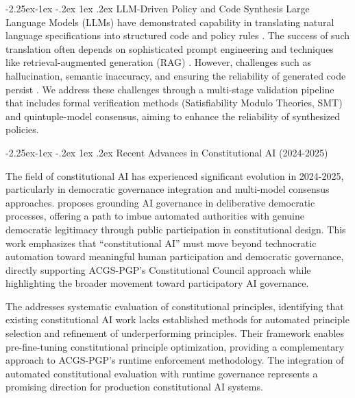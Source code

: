 \documentclass[manuscript,screen,9pt]{acmart}
\makeatletter
\renewcommand\subsection{\@startsection{subsection}{2}{\z@}%
  {-2.25ex\@plus -1ex \@minus -.2ex}%
  {1ex \@plus .2ex}%
  {\normalfont\large\bfseries}}
\makeatother
\begin{document}
\begin{table}[!htb]
\subsection{LLM-Driven Policy and Code Synthesis}
\label{subsec:related_llm_synthesis}
Large Language Models (LLMs) have demonstrated capability in translating natural language specifications into structured code and policy rules \cite{Almulla2024EmergenceLLMPolicy, ResearchGate2025AutoPAC, Li2025VeriCoder}. The success of such translation often depends on sophisticated prompt engineering and techniques like retrieval-augmented generation (RAG) \cite{AnalyticsVidhya2024PromptingTechniques, arXiv2025FutureWorkRAG}. However, challenges such as hallucination, semantic inaccuracy, and ensuring the reliability of generated code persist \cite{AAAI2025CodeHalu, Taeihagh2025Governing}. We address these challenges through a multi-stage validation pipeline that includes formal verification methods (Satisfiability Modulo Theories, SMT) and quintuple-model consensus, aiming to enhance the reliability of synthesized policies.

\subsection{Recent Advances in Constitutional AI (2024-2025)}
\label{subsec:recent_constitutional_ai}

The field of constitutional AI has experienced significant evolution in 2024-2025, particularly in democratic governance integration and multi-model consensus approaches. \citet{Abiri2024PublicConstitutionalAI} proposes grounding AI governance in deliberative democratic processes, offering a path to imbue automated authorities with genuine democratic legitimacy through public participation in constitutional design. This work emphasizes that ``constitutional AI'' must move beyond technocratic automation toward meaningful human participation and democratic governance, directly supporting ACGS-PGP's Constitutional Council approach while highlighting the broader movement toward participatory AI governance.

The \citet{C3AI2025Framework} addresses systematic evaluation of constitutional principles, identifying that existing constitutional AI work lacks established methods for automated principle selection and refinement of underperforming principles. Their framework enables pre-fine-tuning constitutional principle optimization, providing a complementary approach to ACGS-PGP's runtime enforcement methodology. The integration of automated constitutional evaluation with runtime governance represents a promising direction for production constitutional AI systems.


\end{table}
\end{document}
